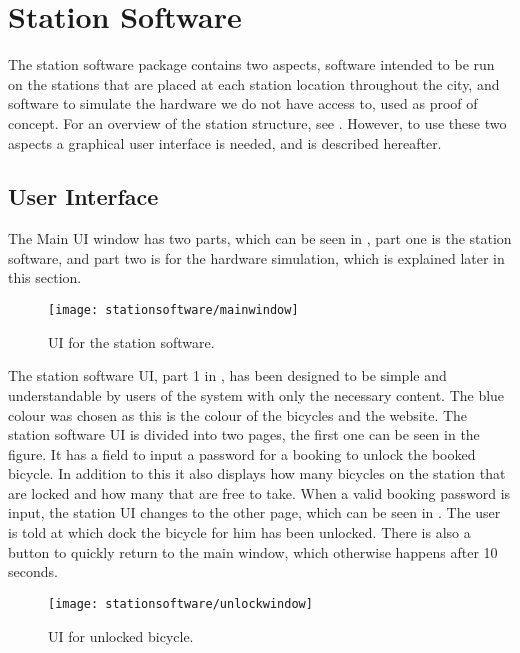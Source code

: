 \section{Station Software}
The station software package contains two aspects, software intended to be run on the stations that are placed at each station location throughout the city, and software to simulate the hardware we do not have access to, used as proof of concept.
For an overview of the station structure, see . 
However, to use these two aspects a graphical user interface is needed, and is described hereafter.

\subsection{User Interface}
The Main UI window has two parts, which can be seen in , part one is the station software, and part two is for the hardware simulation, which is explained later in this section.

\begin{figure}[h]
	\centering
	\texttt{[image: stationsoftware/mainwindow]}
	\caption{UI for the station software.}\label{fig:stationMain}
\end{figure}

The station software UI, part 1 in , has been designed to be simple and understandable by users of the system with only the necessary content.
The blue colour was chosen as this is the colour of the bicycles and the \bycykel website.
The station software UI is divided into two pages, the first one can be seen in the figure.
It has a field to input a password for a booking to unlock the booked bicycle.
In addition to this it also displays how many bicycles on the station that are locked and how many that are free to take.
When a valid booking password is input, the station UI changes to the other page, which can be seen in .
The user is told at which dock the bicycle for him has been unlocked.
There is also a button to quickly return to the main window, which otherwise happens after 10 seconds.

\begin{figure}[h]
	\centering
	\texttt{[image: stationsoftware/unlockwindow]}
	\caption{UI for unlocked bicycle.}\label{fig:bicycleUnlock}
\end{figure}

